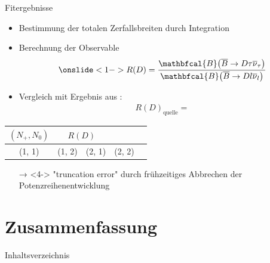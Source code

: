 \documentclass[fleqn, aspectratio=1610, professionalfonts, 9pt]{beamer}
\begin{document}
\begin{frame}{Fitergebnisse}
  \begin{minipage}{7cm}
    \begin{itemize}
      \setlength\itemsep{1em}
      \item<1-> Bestimmung der totalen Zerfallsbreiten durch Integration
      \item<2-> Berechnung der Observable
      \begin{align*}
        \onslide<1->{ R(D) = \frac{{\mathbfcal{B}}\!\left(\overline{B} \to D \tau \overline{\nu}_\tau \right)}{{\mathbfcal{B}}\!\left(\overline{B} \to D l \overline{\nu}_l \right)} }
      \end{align*}
      \item<3-> Vergleich mit Ergebnis aus \cite{PhysRevD.92.034506}:
      \begin{align*}
          R(D)_\text{quelle} = 
      \end{align*}
    \end{itemize}
  \end{minipage}
  \begin{minipage}{7cm}
    \begin{table}
        \centering
        \begin{tabular}{
        S[]
      	S[table-format=1.3]
      	@{${}\pm{}$}
      	S[table-format=1.3]
      	}
      	\toprule
        {$(N_+, N_0)$}  &  \\
        \midrule
        \rule{0pt}{2.2ex}
        (1, 1) & 
        (1, 2) & 
        (2, 1) & 
        (2, 2) & 
        \bottomrule
        \label{tab:r_calc}
        \end{tabular}
    \end{table}
    \begin{itemize}
      \item[→]<4-> "truncation error" durch frühzeitiges Abbrechen der Potenzreihenentwicklung
    \end{itemize}
  \end{minipage}%
\end{frame}



\section{Zusammenfassung}

\begin{frame}{Inhaltsverzeichnis}
  \tableofcontents[currentsection,currentsubsection,
      hideothersubsections,
      sectionstyle=show/shaded,
  ]\end{frame}
\end{document}
